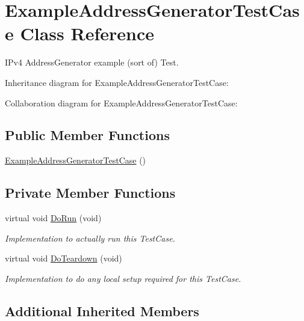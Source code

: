 \hypertarget{classExampleAddressGeneratorTestCase}{}\section{Example\+Address\+Generator\+Test\+Case Class Reference}
\label{classExampleAddressGeneratorTestCase}


I\+Pv4 Address\+Generator example (sort of) Test.  




Inheritance diagram for Example\+Address\+Generator\+Test\+Case\+:


Collaboration diagram for Example\+Address\+Generator\+Test\+Case\+:
\subsection*{Public Member Functions}
\begin{DoxyCompactItemize}
\item 
\hyperlink{classExampleAddressGeneratorTestCase_a92a1ae00fcd81669c24420af5b3874f6}{Example\+Address\+Generator\+Test\+Case} ()
\end{DoxyCompactItemize}
\subsection*{Private Member Functions}
\begin{DoxyCompactItemize}
\item 
virtual void \hyperlink{classExampleAddressGeneratorTestCase_a57e9714a4d078d2e6c1c8f2f8502a482}{Do\+Run} (void)
\begin{DoxyCompactList}\small\item\em Implementation to actually run this Test\+Case. \end{DoxyCompactList}\item 
virtual void \hyperlink{classExampleAddressGeneratorTestCase_a995114c4ae4f8f0e65c8be207dec527a}{Do\+Teardown} (void)
\begin{DoxyCompactList}\small\item\em Implementation to do any local setup required for this Test\+Case. \end{DoxyCompactList}\end{DoxyCompactItemize}
\subsection*{Additional Inherited Members}


